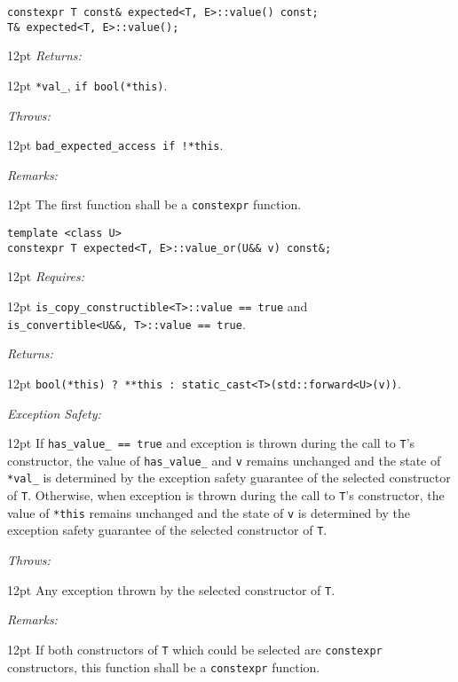 \documentclass[a4paper,10pt]{article}
\newcommand{\cpp}[1]{\lstinline{#1}}
\newcommand{\wordingItem}[1]{\noindent\textit{#1:}}
\newenvironment{wordingTextItem}[1]{\wordingItem{#1}\vspace{7pt}\noindent\begin{adjustwidth}{12pt}{}}{\vspace{7pt}\end{adjustwidth}}
\newenvironment{wordingPara}{\begin{adjustwidth}{12pt}{}}{\end{adjustwidth}}
\begin{document}
\begin{lstlisting}[xleftmargin=0pt]
constexpr T const& expected<T, E>::value() const;
T& expected<T, E>::value(); 
\end{lstlisting}
\begin{wordingPara}
\begin{wordingTextItem}{Returns}
\cpp{*val_}, \cpp{if bool(*this)}.
\end{wordingTextItem}
\begin{wordingTextItem}{Throws}
\cpp{bad_expected_access if !*this}.
\end{wordingTextItem}
\begin{wordingTextItem}{Remarks}
The first function shall be a \cpp{constexpr} function.
\end{wordingTextItem}
\end{wordingPara}

\begin{lstlisting}[xleftmargin=0pt]
template <class U>
constexpr T expected<T, E>::value_or(U&& v) const&; 
\end{lstlisting}
\begin{wordingPara}
\begin{wordingTextItem}{Requires}
\cpp{is_copy_constructible<T>::value == true} and \\
\cpp{is_convertible<U&&, T>::value == true}.
\end{wordingTextItem}
\begin{wordingTextItem}{Returns}
\cpp{bool(*this) ? **this : static_cast<T>(std::forward<U>(v))}.
\end{wordingTextItem}
\begin{wordingTextItem}{Exception Safety}
If \cpp{has_value_ == true} and exception is thrown during the call to \cpp{T}'s constructor, the value of \cpp{has_value_} and \cpp{v} remains unchanged and the state of \cpp{*val_} is determined by the exception safety guarantee of the selected constructor of \cpp{T}. Otherwise, when exception is thrown during the call to \cpp{T}'s constructor, the value of \cpp{*this} remains unchanged and the state of \cpp{v} is determined by the exception safety guarantee of the selected constructor of \cpp{T}.
\end{wordingTextItem}
\begin{wordingTextItem}{Throws}
Any exception thrown by the selected constructor of \cpp{T}.
\end{wordingTextItem}
\begin{wordingTextItem}{Remarks}
If both constructors of \cpp{T} which could be selected are \cpp{constexpr} constructors, this function shall be a \cpp{constexpr} function.
\end{wordingTextItem}
\end{wordingPara}
\end{document}
